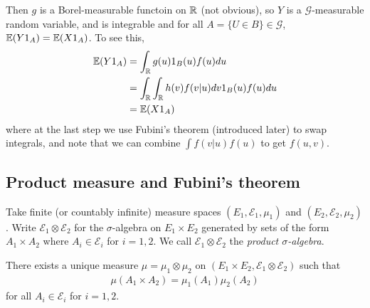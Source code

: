 \documentclass[a4paper]{article}
\begin{document}
Then $g$ is a Borel-measurable functoin on $\mathbb{R}$ (not obvious), so $Y$ is a $\mathcal{G}$-measurable random variable, and is integrable and for all $A = \{U \in B\} \in \mathcal{G}$, $\mathbb{E}(Y 1_A ) = \mathbb{E}(X 1_A)$. To see this, 
\begin{equation*}
\begin{aligned}
\mathbb{E}(Y1_A) &=\int_{\mathbb{R}} g(u) 1_B(u) f(u) du\\
&= \int_{\mathbb{R}} \int_{\mathbb{R}} h(v)f(v|u) dv 1_B(u) f(u) du\\
&=\mathbb{E}(X1_A)
\end{aligned}
\end{equation*}
where at the last step we use Fubini's theorem (introduced later) to swap integrals, and note that we can combine $\int f(v|u) f(u)$ to get $f(u,v)$.

\subsection{Product measure and Fubini's theorem}
Take finite (or countably infinite) measure spaces $(E_1,\mathcal{E}_1,\mu_1)$ and $(E_2,\mathcal{E}_2,\mu_2)$. Write $\mathcal{E}_1 \otimes \mathcal{E}_2$ for the $\sigma$-algebra on $E_1 \times E_2$ generated by sets of the form $A_1 \times A_2$ where $A_i \in \mathcal{E}_i$ for $i=1,2$. We call $\mathcal{E}_1 \otimes \mathcal{E}_2$ the \emph{product $\sigma$-algebra}.

\begin{thm}
There exists a unique measure $\mu=\mu_1 \otimes \mu_2$ on $(E_1 \times E_2, \mathcal{E}_1 \otimes \mathcal{E}_2)$ such that
\begin{equation*}
\begin{aligned}
\mu(A_1 \times A_2) = \mu_1(A_1) \mu_2(A_2)
\end{aligned}
\end{equation*}
for all $A_i \in \mathcal{E}_i$ for $i=1,2$.
\end{thm}
\end{document}
